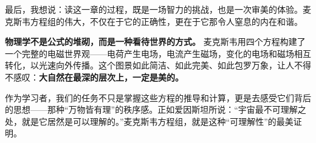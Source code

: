 \documentclass[12pt,a4paper]{ctexart}
\begin{document}
最后，我想说：读这一章的过程，既是一场智力的挑战，也是一次审美的体验。麦克斯韦方程组的伟大，不仅在于它的正确性，更在于它那令人窒息的内在和谐。

\textbf{物理学不是公式的堆砌，而是一种看待世界的方式。} 麦克斯韦用四个方程构建了一个完整的电磁世界观——电荷产生电场，电流产生磁场，变化的电场和磁场相互转化，以光速向外传播。这个图景如此简洁、如此完美、如此包罗万象，让人不得不感叹：\textbf{大自然在最深的层次上，一定是美的。}

作为学习者，我们的任务不只是掌握这些方程的推导和计算，更是去感受它们背后的思想——那种“万物皆有理”的秩序感。正如爱因斯坦所说：“宇宙最不可理解之处，就是它居然是可以理解的。”麦克斯韦方程组，就是这种“可理解性”的最美证明。
\end{document}
